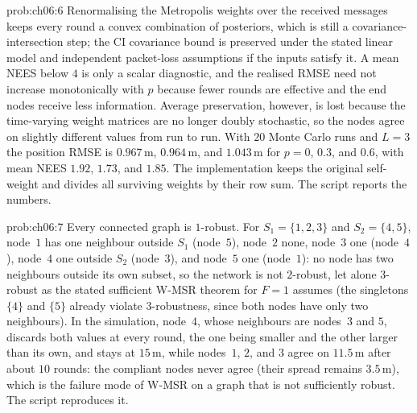 \begin{sol}{prob:ch06:6}
Renormalising the Metropolis weights over the received messages keeps every round a convex combination of posteriors, which is still a covariance-intersection step; the CI covariance bound is preserved under the stated linear model and independent packet-loss assumptions if the inputs satisfy it. A mean NEES below $4$ is only a scalar diagnostic, and the realised RMSE need not increase monotonically with $p$ because fewer rounds are effective and the end nodes receive less information. Average preservation, however, is lost because the time-varying weight matrices are no longer doubly stochastic, so the nodes agree on slightly different values from run to run. With $20$ Monte Carlo runs and $L=3$ the position RMSE is $0.967$\,m, $0.964$\,m, and $1.043$\,m for $p=0$, $0.3$, and $0.6$, with mean NEES $1.92$, $1.73$, and $1.85$. The implementation keeps the original self-weight and divides all surviving weights by their row sum. The script  reports the numbers.
\end{sol}

\begin{sol}{prob:ch06:7}
Every connected graph is $1$-robust. For $S_1=\{1,2,3\}$ and $S_2=\{4,5\}$, node~$1$ has one neighbour outside $S_1$ (node~$5$), node~$2$ none, node~$3$ one (node~$4$), node~$4$ one outside $S_2$ (node~$3$), and node~$5$ one (node~$1$): no node has two neighbours outside its own subset, so the network is not $2$-robust, let alone $3$-robust as the stated sufficient W-MSR theorem for $F=1$ assumes (the singletons $\{4\}$ and $\{5\}$ already violate $3$-robustness, since both nodes have only two neighbours). In the simulation, node~$4$, whose neighbours are nodes~$3$ and $5$, discards both values at every round, the one being smaller and the other larger than its own, and stays at $15$\,m, while nodes~$1$, $2$, and $3$ agree on $11.5$\,m after about $10$ rounds: the compliant nodes never agree (their spread remains $3.5$\,m), which is the failure mode of W-MSR on a graph that is not sufficiently robust. The script  reproduces it.
\end{sol}
